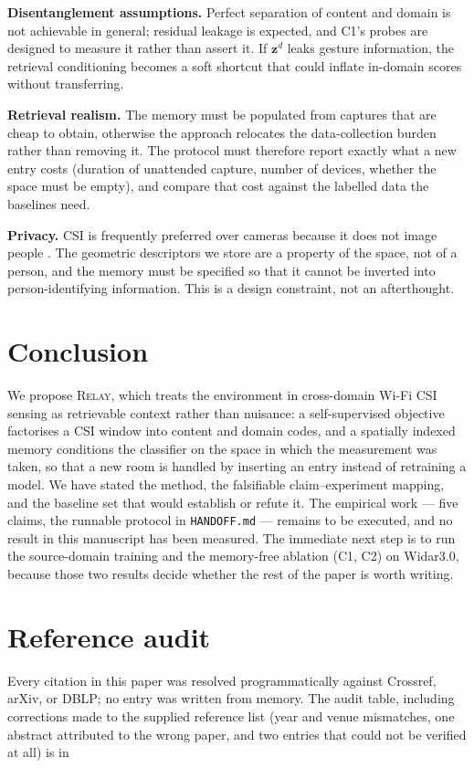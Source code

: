 \documentclass[conference]{IEEEtran}
\newcommand{\method}{\textsc{Relay}}
\newcommand{\zd}{\mathbf{z}^{d}}      %
\begin{document}
\textbf{Disentanglement assumptions.} Perfect separation of content and domain is not
achievable in general; residual leakage is expected, and C1's probes are designed to
measure it rather than assert it. If $\zd$ leaks gesture information, the retrieval
conditioning becomes a soft shortcut that could inflate in-domain scores without
transferring.

\textbf{Retrieval realism.} The memory must be populated from captures that are cheap to
obtain, otherwise the approach relocates the data-collection burden rather than removing
it. The protocol must therefore report exactly what a new entry costs (duration of
unattended capture, number of devices, whether the space must be empty), and compare that
cost against the labelled data the baselines need.

\textbf{Privacy.} CSI is frequently preferred over cameras because it does not image
people \cite{Radwan2025Survey}. The geometric descriptors we store are a property of the
space, not of a person, and the memory must be specified so that it cannot be inverted into
person-identifying information. This is a design constraint, not an afterthought.

\section{Conclusion}
\label{sec:conclusion}

We propose \method{}, which treats the environment in cross-domain Wi-Fi CSI sensing as
retrievable context rather than nuisance: a self-supervised objective factorises a CSI
window into content and domain codes, and a spatially indexed memory conditions the
classifier on the space in which the measurement was taken, so that a new room is handled
by inserting an entry instead of retraining a model. We have stated the method, the
falsifiable claim--experiment mapping, and the baseline set that would establish or refute
it. The empirical work --- five claims, the runnable protocol in \texttt{HANDOFF.md} ---
remains to be executed, and no result in this manuscript has been measured. The immediate
next step is to run the source-domain training and the memory-free ablation (C1, C2) on
Widar3.0, because those two results decide whether the rest of the paper is worth writing.




\appendices
\section{Reference audit}
\label{app:refs}
Every citation in this paper was resolved programmatically against Crossref, arXiv, or
DBLP; no entry was written from memory. The audit table, including corrections made to the
supplied reference list (year and venue mismatches, one abstract attributed to the wrong
paper, and two entries that could not be verified at all) is in
\end{document}
